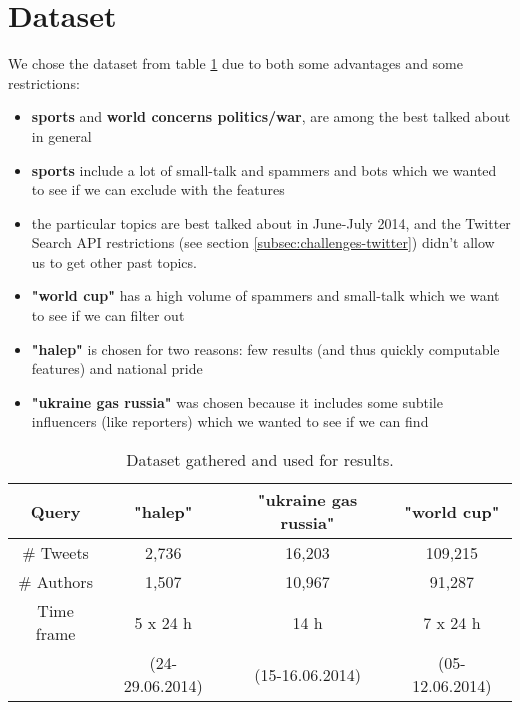 \section{Dataset}
\label{sec:dataset}


We chose the dataset from table \ref{table:dataset} due to both some advantages and some restrictions:
\begin{itemize}
	\item \textbf{sports} and \textbf{world concerns politics/war}, are among the best talked about in general
    \item \textbf{sports} include a lot of small-talk and spammers and bots which we wanted to see if we can exclude with the features
    \item the particular topics are best talked about in June-July 2014, and the Twitter Search API restrictions (see section \ref{subsec:challenges-twitter}) didn't allow us to get other past topics.
    \item \textbf{"world cup"} has a high volume of spammers and small-talk which we want to see if we can filter out
    \item \textbf{"halep"} is chosen for two reasons: few results (and thus quickly computable features) and national pride
    \item \textbf{"ukraine gas russia"} was chosen because it includes some subtile influencers (like reporters) which we wanted to see if we can find
\end{itemize}



\begin{table}[!h]
\centering
\setlength{\tabcolsep}{12pt}
\begin{tabular}{ | c | c | c| c| }
\hline
Query & "halep" & "ukraine gas russia" & "world cup"\\
\hline
\# Tweets & 2,736 & 16,203 & 109,215\\
\hline
\# Authors & 1,507 & 10,967 & 91,287\\
\hline
Time frame & 5 x 24 h  & 14 h  & 7 x 24 h \\
           & (24-29.06.2014) & (15-16.06.2014) & (05-12.06.2014) \\
\hline
\end{tabular}
\caption{Dataset gathered and used for results.}
\label{table:dataset}
\end{table}



